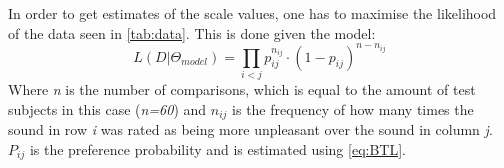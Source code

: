In order to get estimates of the scale values, one has to maximise the likelihood of the data seen in \autoref{tab:data}. This is done given the model: 
%
\begin{equation}
L(D|\Theta_{model}) = \prod_{i<j} p_{ij} ^{n_{ij}}\cdot(1- p_{ij})^{n-n_{ij}}
\end{equation}
\noindent 
%
Where \textit{n} is the number of comparisons, which is equal to the amount of test subjects in this case (\textit{n=60}) and $n_{ij}$ is the frequency of how many times the sound in row \textit{i} was rated as being more unpleasant over the sound in column \textit{j}. $P_{ij}$ is the preference probability and is estimated using \autoref{eq:BTL}. 
